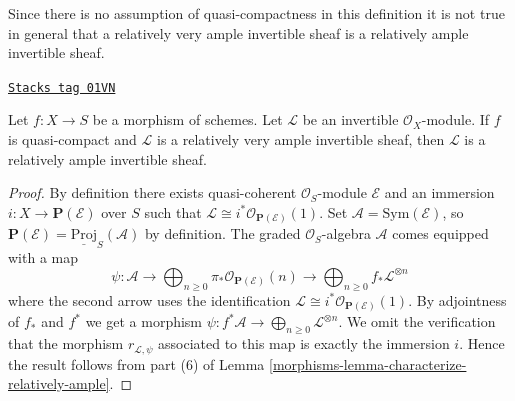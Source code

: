 Since there is no assumption of quasi-compactness in this definition it is not
true in general that a relatively very ample invertible sheaf is a relatively
ample invertible sheaf.

\begin{lemma}
\label{morphisms-lemma-ample-very-ample}
\href{https://stacks.math.columbia.edu/tag/01VN}{\texttt{Stacks tag 01VN}}

\begin{reference}
\cite[II, Proposition 4.6.2]{EGA}
\end{reference}
Let $f : X \to S$ be a morphism of schemes.
Let $\mathcal{L}$ be an invertible $\mathcal{O}_X$-module.
If $f$ is quasi-compact and $\mathcal{L}$ is a relatively
very ample invertible sheaf, then $\mathcal{L}$ is a relatively
ample invertible sheaf.
\end{lemma}

\begin{proof}

By definition there exists quasi-coherent $\mathcal{O}_S$-module
$\mathcal{E}$ and an immersion $i : X \to \mathbf{P}(\mathcal{E})$
over $S$ such that
$\mathcal{L} \cong i^*\mathcal{O}_{\mathbf{P}(\mathcal{E})}(1)$.
Set $\mathcal{A} = \text{Sym}(\mathcal{E})$, so
$\mathbf{P}(\mathcal{E}) = \underline{\text{Proj}}_S(\mathcal{A})$
by definition. The graded $\mathcal{O}_S$-algebra $\mathcal{A}$
comes equipped with a map
$$
\psi :
\mathcal{A} \to
\bigoplus\nolimits_{n \geq 0}
\pi_*\mathcal{O}_{\mathbf{P}(\mathcal{E})}(n) \to
\bigoplus\nolimits_{n \geq 0}
f_*\mathcal{L}^{\otimes n}
$$
where the second arrow uses the identification
$\mathcal{L} \cong i^*\mathcal{O}_{\mathbf{P}(\mathcal{E})}(1)$.
By adjointness of $f_*$ and $f^*$ we get a morphism
$\psi : f^*\mathcal{A} \to \bigoplus_{n \geq 0}\mathcal{L}^{\otimes n}$.
We omit the verification that the morphism $r_{\mathcal{L}, \psi}$
associated to this map is exactly the immersion $i$.
Hence the result follows from
part (6) of Lemma \ref{morphisms-lemma-characterize-relatively-ample}.
\end{proof}

